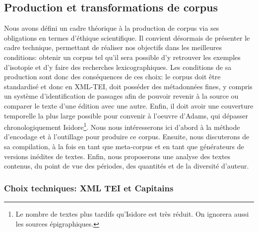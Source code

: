 
\subsection{Production et transformations de corpus}

Nous avons défini un cadre théorique à la production de corpus via ses obligations en termes d'éthique scientifique. Il convient désormais de présenter le cadre technique, permettant de réaliser nos objectifs dans les meilleures conditions: obtenir un corpus tel qu'il sera possible d'y retrouver les exemples d'isotopie et d'y faire des recherches lexicographiques. Les conditions de sa production sont donc des conséquences de ces choix: le corpus doit être standardisé et donc en XML-TEI, doit posséder des métadonnées fines, y compris un système d'identification de passages afin de pouvoir revenir à la source ou comparer le texte d'une édition avec une autre. Enfin, il doit avoir une couverture temporelle la plus large possible pour convenir à l'oeuvre d'Adams, qui dépasser chronologiquement Isidore\footnote{Le nombre de textes plus tardifs qu'Isidore est très réduit. On ignorera aussi les sources épigraphiques.}. Nous nous intéresserons ici d'abord à la méthode d'encodage et à l'outillage pour produire ce corpus. Ensuite, nous discuterons de sa compilation, à la fois en tant que meta-corpus et en tant que générateurs de versions inédites de textes. Enfin, nous proposerons une analyse des textes contenus, du point de vue des périodes, des quantités et de la diversité d'auteur.


\subsubsection{Choix techniques: XML TEI et Capitains}

